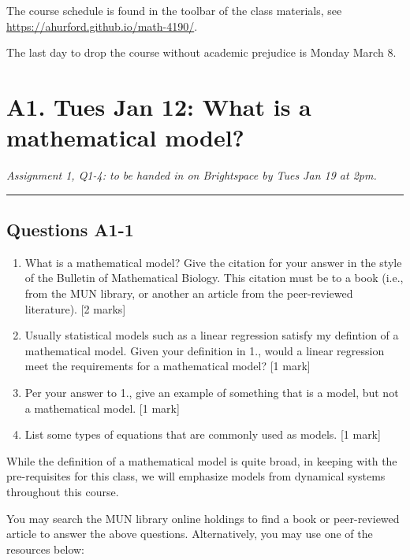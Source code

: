 \documentclass[]{book}
\begin{document}
The course schedule is found in the toolbar of the class materials, see
\url{https://ahurford.github.io/math-4190/}.

The last day to drop the course without academic prejudice is Monday
March 8.

\chapter{A1. Tues Jan 12: What is a mathematical
model?}\label{a1.-tues-jan-12-what-is-a-mathematical-model}

\emph{Assignment 1, Q1-4: to be handed in on Brightspace by Tues Jan 19
at 2pm.}

\begin{center}\rule{0.5\linewidth}{0.5pt}\end{center}

\section{Questions A1-1}\label{questions-a1-1}

\begin{enumerate}
\def\labelenumi{\arabic{enumi}.}
\item
  What is a mathematical model? Give the citation for your answer in the
  style of the Bulletin of Mathematical Biology. This citation must be
  to a book (i.e., from the MUN library, or another an article from the
  peer-reviewed literature). {[}2 marks{]}
\item
  Usually statistical models such as a linear regression satisfy my
  defintion of a mathematical model. Given your definition in 1., would
  a linear regression meet the requirements for a mathematical model?
  {[}1 mark{]}
\item
  Per your answer to 1., give an example of something that is a model,
  but not a mathematical model. {[}1 mark{]}
\item
  List some types of equations that are commonly used as models. {[}1
  mark{]}
\end{enumerate}

While the definition of a mathematical model is quite broad, in keeping
with the pre-requisites for this class, we will emphasize models from
dynamical systems throughout this course.

You may search the MUN library online holdings to find a book or
peer-reviewed article to answer the above questions. Alternatively, you
may use one of the resources below:
\end{document}
